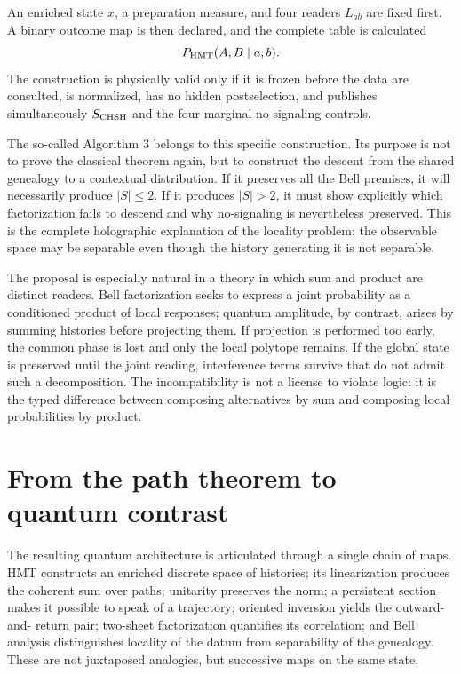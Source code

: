 \begin{construction}
An enriched state \(x\), a preparation measure, and four
readers \(L_{ab}\) are fixed first. A binary outcome map is then declared, and
the complete table is calculated
\[
  P_{\rm HMT}(A,B\mid a,b).
\]
The construction is physically valid only if it is frozen before the data are
consulted, is normalized, has no hidden postselection, and publishes simultaneously
\(S_{\rm CHSH}\) and the four marginal no-signaling controls.
\end{construction}

The so-called Algorithm 3 belongs to this specific construction. Its purpose is not to prove the classical theorem again, but to construct the descent from the shared genealogy to a contextual distribution. If it preserves all the Bell premises, it will necessarily produce \(|S|\leq2\). If it produces \(|S|>2\), it must show explicitly which factorization fails to descend and why no-signaling is nevertheless preserved. This is the complete holographic explanation of the locality problem: the observable space may be separable even though the history generating it is not separable.

The proposal is especially natural in a theory in which sum and product are
distinct readers. Bell factorization seeks to express a joint probability
as a conditioned product of local responses; quantum amplitude, by contrast,
arises by summing histories before projecting them. If projection is
performed too early, the common phase is lost and only the local polytope remains.
If the global state is preserved until the joint reading, interference terms
survive that do not admit such a decomposition. The incompatibility is not a
license to violate logic: it is the typed difference between composing alternatives
by sum and composing local probabilities by product.

\section{From the path theorem to quantum contrast}

The resulting quantum architecture is articulated through a single chain of maps. HMT
constructs an enriched discrete space of histories; its linearization produces the
coherent sum over paths; unitarity preserves the norm; a persistent section
makes it possible to speak of a trajectory; oriented inversion yields the outward-and-
return pair; two-sheet factorization quantifies its correlation; and Bell analysis
distinguishes locality of the datum from separability of the genealogy. These are not
juxtaposed analogies, but successive maps on the same state.

